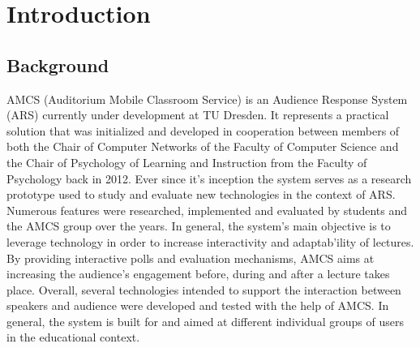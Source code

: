 
\chapter{Introduction}

\section{Background}

AMCS (Auditorium Mobile Classroom Service) is an Audience Response System (ARS) currently under development at TU Dresden.
It represents a practical solution that was initialized and developed in cooperation between members of both the Chair of Computer Networks of the Faculty of Computer Science and the Chair of Psychology of Learning and Instruction from the Faculty of Psychology back in 2012. Ever since it's inception the system serves as a research prototype used to study and evaluate new technologies in the context of ARS. Numerous features were researched, implemented and evaluated by students and the AMCS group over the years.
\newline
\newline
In general, the system's main objective is to leverage technology in order to increase interactivity and adaptab'ility of lectures. By providing interactive polls and evaluation mechanisms, AMCS aims at increasing the audience's engagement before, during and after a lecture takes place. Overall, several technologies intended to support the interaction between speakers and audience were developed and tested with the help of AMCS.
\newline
\newline
In general, the system is built for and aimed at different individual groups of users in the educational context.

